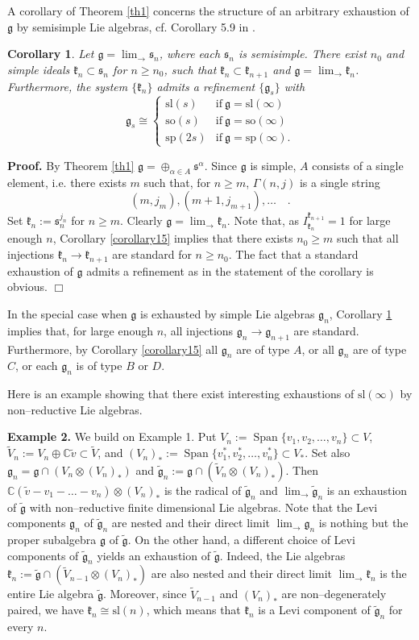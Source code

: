 \documentclass[oneside,leqno,12pt]{article}
\newcounter{theorem}
\newtheorem{corollary}[theo]{Corollary}
\newenvironment{proof}{ \noindent \textbf{Proof.}}{\hfill $\Box$}
\def\gg{\mathfrak{g}}
\def\gk{\mathfrak{k}}
\def\C{\mathbb{C}}
\DeclareMathOperator{\Span}{Span}
\renewcommand{\ss}{\mathfrak{s}}
\newcommand{\kk}{\mathfrak{k}}
\renewcommand{\gg}{\mathfrak{g}}
\newcommand{\triplebrace}[6]{\left\{\begin{array}{ll}#1 & #2 \\ #3 & #4 \\ #5 & #6 \end{array}\right.}
\newcommand{\refth}[1]{Theorem \ref{#1}}
\newcommand{\refcor}[1]{Corollary \ref{#1}}
\renewcommand{\sp}{\mathrm{sp}}
\renewcommand{\sl}{\mathrm{sl}}
\newcommand{\so}{\mathrm{so}}
\newcommand{\inj}{\displaystyle \lim_\to}
\begin{document}
A  corollary of \refth{th1} concerns the structure of an arbitrary exhaustion of $\gg$ by semisimple Lie algebras, cf. Corollary 5.9 in \cite{Ba2}.
\begin{corollary}\label{corth1}
Let $\displaystyle\gg=\lim_\to\ss_n$, where each $\ss_n$ is semisimple. There exist $n_0$ and simple ideals 
$\kk_n\subset\ss_n$ for $n\geq n_0$, such that $\kk_n\subset\kk_{n+1}$ and $\displaystyle\gg=\lim_\to\kk_n$. 
Furthermore, the system $\{\kk_n\}$ admits a refinement $\{\gg_s\}$ with 
\[
\gg_s\cong\triplebrace{\sl(s)}{\mathrm{if~}\gg=\sl(\infty)}{\so(s)}{\mathrm{if~}\gg=\so(\infty)}{\sp(2s)}{\mathrm{if~}\gg=\sp(\infty).}
\] 
\end{corollary}
\begin{proof}
By \refth{th1} $\gg=\oplus_{\alpha\in A}\ss^\alpha$. Since $\gg$ is simple, $A$ consists of a single element, i.e. there exists $m$ such that,
for $n\geq m$, $\Gamma(n,j)$ is a single string
\[
(m,j_m),(m+1,j_{m+1}),\dots\quad .
\]
Set $\kk_n:=\ss_n^{j_n}$ for $n \geq m$. Clearly $\displaystyle\gg=\lim_\to\kk_n$. Note that, as $I_{\gk_n}^{\gk_{n+1}} =1$ for large enough $n$, 
Corollary \ref{corollary15} implies that
there exists $n_0 \geq m$ such that
all injections $\gk_n \to \gk_{n+1}$ are standard for $n \geq n_0$.  The fact that a standard exhaustion of $\gg$ admits 
 a refinement as in the statement of the corollary is  obvious.
\end{proof}

In the special case when $\gg$ is exhausted by simple Lie algebras $\gg_n$, \refcor{corth1} implies that, for large enough $n$,
all injections $\gg_n \to \gg_{n+1}$ are standard. Furthermore, by 
 Corollary \ref{corollary15}
all $\gg_n$ are of type $A$, or all $\gg_n$ are of type $C$, or each $\gg_n$ is of type $B$ or $D$.

Here is an example showing that there exist interesting exhaustions of $\sl(\infty)$ by non--reductive Lie algebras. 

\medskip

\noindent\textbf{Example 2.} We build on Example 1.
Put $V_n := \Span \{v_1 , v_2 , \dots ,v_n \} \subset V$, $\tilde{V}_n := V_n \oplus \C \tilde{v} \subset \tilde{V}$, and
$(V_n)_* := \Span \{v_1^* , v_2^* , \dots ,v_n^* \} \subset V_*$. Set also $\gg_n = \gg \cap (V_n \otimes (V_n)_*)$ and 
$\tilde{\gg}_n := \gg \cap (\tilde{V}_n \otimes (V_n)_*)$. 
Then $\C (\tilde{v} - v_1 - \dots - v_n) \otimes (V_n)_*$ is the radical of $\tilde{\gg}_n$ and $\inj \tilde{\gg}_n$ is an exhaustion 
of $\tilde{\gg}$ with non--reductive finite dimensional Lie algebras.
Note that the Levi components $\gg_n$ of $\tilde{\gg}_n$ are nested and their direct limit $\inj \gg_n$ is nothing but the proper subalgebra
$\gg$ of $\tilde{\gg}$. On the other hand, a different choice of Levi components of $\tilde{\gg}_n$ yields an exhaustion of $\tilde{\gg}$. Indeed,
the Lie algebras $\gk_n := \tilde{\gg} \cap (\tilde{V}_{n-1} \otimes (V_n)_*)$ are also nested
and their direct limit $\inj \gk_n$ is the entire Lie algebra $\tilde{\gg}$. Moreover, since $\tilde{V}_{n-1}$ and 
$(V_n)_*$ are non--degenerately paired, we have $\gk_n \cong \sl(n)$,  which means that $\gk_n$ is a Levi component of $\tilde{\gg}_n$ for
every $n$.
\end{document}
